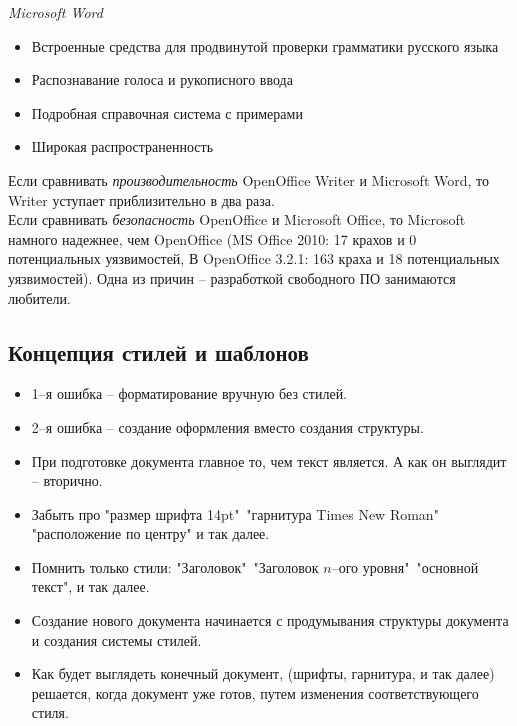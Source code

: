 \begin{center}
  \emph{Microsoft Word}
\end{center}
\begin{itemize}
  \item Встроенные средства для продвинутой проверки грамматики русского языка
  \item Распознавание голоса и рукописного ввода
  \item Подробная справочная система с примерами
  \item Широкая распространенность
\end{itemize}
Если сравнивать \emph{производительность} OpenOffice Writer и Microsoft Word, то Writer уступает приблизительно в два раза.
\\Если сравнивать \emph{безопасность} OpenOffice и Microsoft Office, то Microsoft намного надежнее, чем OpenOffice (MS Office 2010: 17 крахов и 0 потенциальных уязвимостей, В OpenOffice 3.2.1: 163 краха и 18 потенциальных уязвимостей). Одна из причин -- разработкой свободного ПО занимаются любители.
\subsection{Концепция стилей и шаблонов}
\begin{itemize}
  \item 1--я ошибка -- форматирование вручную без стилей.
  \item 2--я ошибка -- создание оформления вместо создания структуры.
  \item При подготовке документа главное то, чем текст является. А как он выглядит -- вторично.
  \item Забыть про "размер шрифта 14pt"\, "гарнитура Times New Roman"\, "расположение по центру" и так далее.
  \item Помнить только стили: "Заголовок"\, "Заголовок $n$--ого уровня"\, "основной текст", и так далее.
  \item Создание нового документа начинается с продумывания структуры документа и создания системы стилей.
  \item Как будет выглядеть конечный документ, (шрифты, гарнитура, и так далее) решается, когда документ уже готов, путем изменения соответствующего стиля.
\end{itemize}
